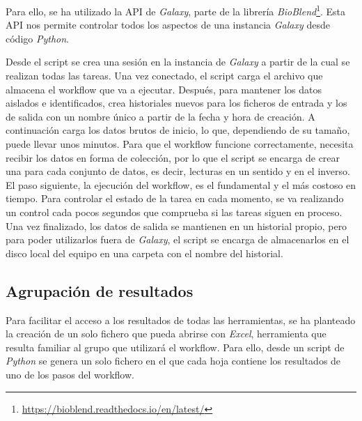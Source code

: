 Para ello, se ha utilizado la API de \textit{Galaxy}, parte de la librería \textit{BioBlend}\footnote{\url{https://bioblend.readthedocs.io/en/latest/}}. Esta API nos permite controlar todos los aspectos de una instancia \textit{Galaxy} desde código \textit{Python}.

Desde el script se crea una sesión en la instancia de \textit{Galaxy} a partir de la cual se realizan todas las tareas. Una vez conectado, el script carga el archivo que almacena el workflow que va a ejecutar. Después, para mantener los datos aislados e identificados, crea historiales nuevos para los ficheros de entrada y los de salida con un nombre único a partir de la fecha y hora de creación. A continuación carga los datos brutos de inicio, lo que, dependiendo de su tamaño, puede llevar unos minutos. Para que el workflow funcione correctamente, necesita recibir los datos en forma de colección, por lo que el script se encarga de crear una para cada conjunto de datos, es decir, lecturas en un sentido y en el inverso. El paso siguiente, la ejecución del workflow, es el fundamental y el más costoso en tiempo. Para controlar el estado de la tarea en cada momento, se va realizando un control cada pocos segundos que comprueba si las tareas siguen en proceso. Una vez finalizado, los datos de salida se mantienen en un historial propio, pero para poder utilizarlos fuera de \textit{Galaxy}, el script se encarga de almacenarlos en el disco local del equipo en una carpeta con el nombre del historial.

\subsection{Agrupación de resultados}
Para facilitar el acceso a los resultados de todas las herramientas, se ha planteado la creación de un solo fichero que pueda abrirse con \textit{Excel}, herramienta que resulta familiar al grupo que utilizará el workflow. Para ello, desde un script de \textit{Python} se genera un solo fichero en el que cada hoja contiene los resultados de uno de los pasos del workflow.
